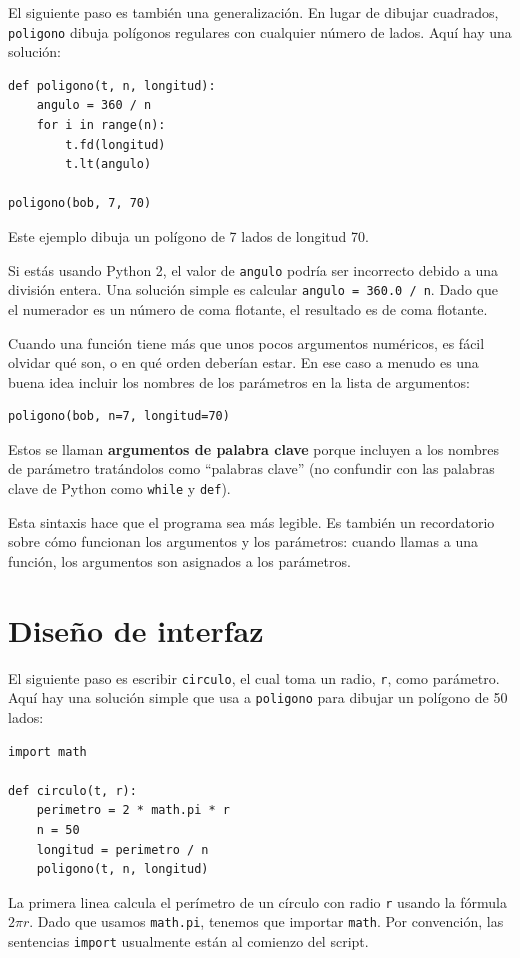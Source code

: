 \documentclass[10pt]{book}
\begin{document}
El siguiente paso es también una generalización.  En lugar de dibujar
cuadrados, {\tt poligono} dibuja polígonos regulares con cualquier número de
lados.  Aquí hay una solución:

\begin{verbatim}
def poligono(t, n, longitud):
    angulo = 360 / n
    for i in range(n):
        t.fd(longitud)
        t.lt(angulo)

poligono(bob, 7, 70)
\end{verbatim}
%
Este ejemplo dibuja un polígono de 7 lados de longitud 70.

Si estás usando Python 2, el valor de {\tt angulo} podría ser incorrecto
debido a una división entera.  Una solución simple es calcular
{\tt angulo = 360.0 / n}.  Dado que el numerador es un número de
coma flotante, el resultado es de coma flotante.

Cuando una función tiene más que unos pocos argumentos numéricos, es fácil
olvidar qué son, o en qué orden deberían estar.  En ese caso
a menudo es una buena idea incluir los nombres de los parámetros en la
lista de argumentos:

\begin{verbatim}
poligono(bob, n=7, longitud=70)
\end{verbatim}
%
Estos se llaman {\bf argumentos de palabra clave} porque incluyen
a los nombres de parámetro tratándolos como ``palabras clave'' (no confundir con
las palabras clave de Python como {\tt while} y {\tt def}).

Esta sintaxis hace que el programa sea más legible.  Es también un recordatorio
sobre cómo funcionan los argumentos y los parámetros: cuando llamas a una función, los
argumentos son asignados a los parámetros.


\section{Diseño de interfaz}

El siguiente paso es escribir {\tt circulo}, el cual toma un radio,
{\tt r}, como parámetro.  Aquí hay una solución simple que usa a
{\tt poligono} para dibujar un polígono de 50 lados:

\begin{verbatim}
import math

def circulo(t, r):
    perimetro = 2 * math.pi * r
    n = 50
    longitud = perimetro / n
    poligono(t, n, longitud)
\end{verbatim}
%
La primera linea calcula el perímetro de un círculo con radio
{\tt r} usando la fórmula $2 \pi r$.  Dado que usamos {\tt math.pi},
tenemos que importar {\tt math}.  Por convención, las sentencias {\tt import}
usualmente están al comienzo del script.
\end{document}
